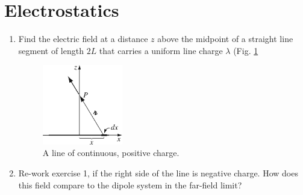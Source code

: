 \documentclass[12pt]{article}
\begin{document}
\maketitle

\section{Electrostatics}

\begin{enumerate}
\item Find the electric field at a distance $z$ above the midpoint of a straight line segment of length $2L$ that carries a uniform line charge $\lambda$ (Fig. \ref{fig:line}
\begin{figure}[ht]
\centering
\includegraphics[width=0.33\textwidth]{figures/2_6.jpg}
\caption{\label{fig:line} A line of continuous, positive charge.}
\end{figure}
\item Re-work exercise 1, if the right side of the line is negative charge.  How does this field compare to the dipole system in the far-field limit?
\end{enumerate}
\end{document}
